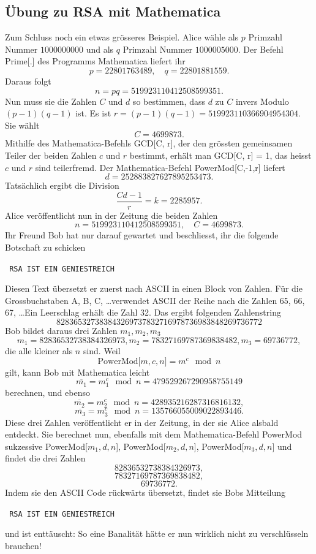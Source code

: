 \documentclass[%
<<<<<<< Updated upstream
11pt,%
twoside,%
titlepage,%
german,%
headsepline%
]{scrartcl}
\begin{document}
\subsection{Übung zu RSA mit Mathematica}
Zum
Schluss noch ein etwas grösseres Beispiel. Alice wähle als $p$ Primzahl Nummer $1000000000$ und als $q$ Primzahl Nummer $1000005000$. Der Befehl Prime[.] des Programms Mathematica liefert ihr
$$p = 22801763489,\quad	q = 22801881559.$$
Daraus folgt
$$n = pq = 519923110412508599351.$$
Nun muss sie die Zahlen $C$ und $d$ so bestimmen, dass $d$ zu $C$ invers Modulo $(p-1)(q-1)$ ist. Es ist
$r = (p-1)(q-1) = 519923110366904954304$. Sie wählt
$$C = 4699873.$$
Mithilfe des Mathematica-Befehls GCD[C, r], der den grössten gemeinsamen Teiler der beiden Zahlen $c$ und $r$ bestimmt, erhält man GCD[C, r] = 1, das heisst $c$ und $r$ sind teilerfremd. Der Mathematica-Befehl PowerMod[C,-1,r] liefert
$$d = 252883827627895253473.$$
Tatsächlich ergibt die Division
$$\frac{Cd - 1}{r} = k = 2285957.$$
Alice veröffentlicht nun in der Zeitung die beiden Zahlen
$$n = 519923110412508599351,\quad	C = 4699873.$$
Ihr Freund Bob hat nur darauf gewartet und beschliesst, ihr die folgende Botschaft zu schicken
\begin{center}
\texttt{
RSA IST EIN GENIESTREICH
}
\end{center}
Diesen Text übersetzt er zuerst nach ASCII in einen Block von Zahlen. Für die Grossbuchstaben A, B, C, \dots verwendet ASCII der Reihe nach die Zahlen 65, 66, 67, \dots Ein Leerschlag erhält die Zahl 32. Das ergibt folgenden Zahlenstring
$$82 83 65 32 73 83 84 32 69 73 78 32 71 69 78 73 69 83 84 82 69 73 67 72$$
Bob bildet daraus drei Zahlen $m_1, m_2, m_3$
$$m_1 = 82836532738384326973, m_2 = 78327169787369838482, m_3 = 69736772,$$
die alle kleiner als $n$ sind. Weil
$$\text{PowerMod[$m,c,n$]} = m^c\mod n$$
gilt, kann Bob mit Mathematica leicht
$$\overline{m_1} = m_1^c\mod n = 479529267290958755149$$
berechnen, und ebenso
$$\overline{m_2} = m_2^c\mod n = 428935216287316816132,$$
$$\overline{m_3} = m_3^c\mod n = 135766055009022893446.$$
Diese drei Zahlen veröffentlicht er in der Zeitung, in der sie Alice alsbald entdeckt. Sie berechnet nun, ebenfalls mit dem Mathematica-Befehl PowerMod sukzessive PowerMod[$m_1,d,n$], 
PowerMod[$m_2,d,n$], PowerMod[$m_3,d,n$] und findet die drei Zahlen
$$82836532738384326973,$$
$$78327169787369838482,$$
$$69736772.$$
Indem sie den ASCII Code rückwärts übersetzt, findet sie Bobs Mitteilung
\begin{center}
\texttt{
RSA IST EIN GENIESTREICH
}
\end{center}
und ist enttäuscht: So eine Banalität hätte er nun wirklich nicht zu verschlüsseln brauchen!
\end{document}

